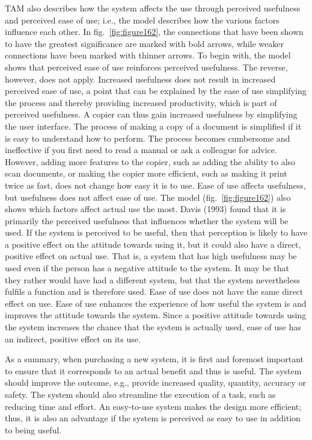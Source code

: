 \documentclass[
  12pt,
]{scrbook}
\begin{document}
TAM also describes how the system affects the use through perceived usefulness and perceived ease of use; i.e., the model describes how the various factors influence each other. In fig.~\ref{fig:figure162}, the connections that have been shown to have the greatest significance are marked with bold arrows, while weaker connections have been marked with thinner arrows. To begin with, the model shows that perceived ease of use reinforces perceived usefulness. The reverse, however, does not apply. Increased usefulness does not result in increased perceived ease of use, a point that can be explained by the ease of use simplifying the process and thereby providing increased productivity, which is part of perceived usefulness. A copier can thus gain increased usefulness by simplifying the user interface. The process of making a copy of a document is simplified if it is easy to understand how to perform. The process becomes cumbersome and ineffective if you first need to read a manual or ask a colleague for advice. However, adding more features to the copier, such as adding the ability to also scan documents, or making the copier more efficient, such as making it print twice as fast, does not change how easy it is to use. Ease of use affects usefulness, but usefulness does not affect ease of use. The model (fig.~\ref{fig:figure162}) also shows which factors affect actual use the most. Davis (1993) found that it is primarily the perceived usefulness that influences whether the system will be used. If the system is perceived to be useful, then that perception is likely to have a positive effect on the attitude towards using it, but it could also have a direct, positive effect on actual use. That is, a system that has high usefulness may be used even if the person has a negative attitude to the system. It may be that they rather would have had a different system, but that the system nevertheless fulfils a function and is therefore used. Ease of use does not have the same direct effect on use. Ease of use enhances the experience of how useful the system is and improves the attitude towards the system. Since a positive attitude towards using the system increases the chance that the system is actually used, ease of use has an indirect, positive effect on its use.

As a summary, when purchasing a new system, it is first and foremost important to ensure that it corresponds to an actual benefit and thus is useful. The system should improve the outcome, e.g., provide increased quality, quantity, accuracy or safety. The system should also streamline the execution of a task, such as reducing time and effort. An easy-to-use system makes the design more efficient; thus, it is also an advantage if the system is perceived as easy to use in addition to being useful.
\end{document}
